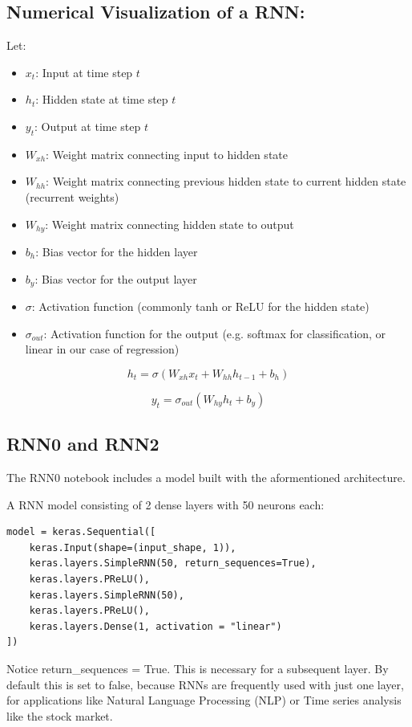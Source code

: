 \documentclass{article}
\begin{document}
\subsection{Numerical Visualization of a RNN:}
Let:
\begin{itemize}
    \item $x_t$: Input at time step $t$
    \item $h_t$: Hidden state at time step $t$
    \item $y_t$: Output at time step $t$
    \item $W_{xh}$: Weight matrix connecting input to hidden state
    \item $W_{hh}$: Weight matrix connecting previous hidden state to current hidden state (recurrent weights)
    \item $W_{hy}$: Weight matrix connecting hidden state to output
    \item $b_h$: Bias vector for the hidden layer
    \item $b_y$: Bias vector for the output layer
    \item $\sigma$: Activation function (commonly tanh or ReLU for the hidden state)
    \item $\sigma_{out}$: Activation function for the output (e.g. softmax for classification, or linear in our case of regression)
\end{itemize}



$$h_t = \sigma(W_{xh}x_t + W_{hh}h_{t-1} + b_h)$$

$$y_t = \sigma_{out}(W_{hy}h_t + b_y)$$


\subsection{RNN0 and RNN2}
The RNN0 notebook includes a model built with the aformentioned architecture.

A RNN model consisting of 2 dense layers with 50 neurons each:

\begin{Verbatim}
model = keras.Sequential([
    keras.Input(shape=(input_shape, 1)),
    keras.layers.SimpleRNN(50, return_sequences=True),
    keras.layers.PReLU(),
    keras.layers.SimpleRNN(50),
    keras.layers.PReLU(),
    keras.layers.Dense(1, activation = "linear")
])
\end{Verbatim}
Notice return\_sequences = True. This is necessary for a subsequent layer. 
By default this is set to false, because RNNs are frequently used with just 
one layer, for applications like Natural Language Processing (NLP) or Time 
series analysis like the stock market.
\end{document}
